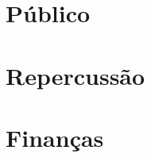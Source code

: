 \documentclass[12pt]{article}
\begin{document}
\newpage

\section*{Público}


\newpage

\section*{Repercussão}


\newpage

\section*{Finanças}

\end{document}
